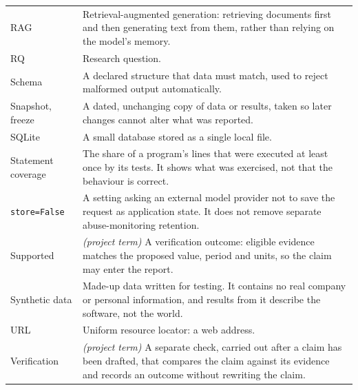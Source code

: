 \begin{longtable}{P{0.20\textwidth}P{0.72\textwidth}}
RAG & Retrieval-augmented generation: retrieving documents first and then generating text from them, rather than relying on the model's memory. \\
RQ & Research question. \\
Schema & A declared structure that data must match, used to reject malformed output automatically. \\
Snapshot, freeze & A dated, unchanging copy of data or results, taken so later changes cannot alter what was reported. \\
SQLite & A small database stored as a single local file. \\
Statement coverage & The share of a program's lines that were executed at least once by its tests. It shows what was exercised, not that the behaviour is correct. \\
\texttt{store=False} & A setting asking an external model provider not to save the request as application state. It does not remove separate abuse-monitoring retention. \\
Supported & \textit{(project term)} A verification outcome: eligible evidence matches the proposed value, period and units, so the claim may enter the report. \\
Synthetic data & Made-up data written for testing. It contains no real company or personal information, and results from it describe the software, not the world. \\
URL & Uniform resource locator: a web address. \\
Verification & \textit{(project term)} A separate check, carried out after a claim has been drafted, that compares the claim against its evidence and records an outcome without rewriting the claim. \\
\bottomrule
\end{longtable}
